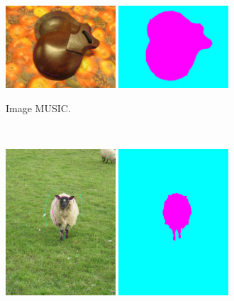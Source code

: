 \begin{figure}[htb]
	\centering	
	 \begin{subfigure}[B]{0.7\textwidth}	
			\includegraphics[width=0.45\textwidth]{images/evaluation/Milles/music_seeds.jpg}
			\includegraphics[width=0.45\textwidth]{images/evaluation/Milles/music_seg.png}
		 \caption{Image MUSIC.}
	\end{subfigure}	
	\\
	 \begin{subfigure}[B]{0.7\textwidth}	
			\includegraphics[width=0.45\textwidth]{images/evaluation/Milles/sheep_seeds.jpg}
			\includegraphics[width=0.45\textwidth]{images/evaluation/Milles/sheep_seg.png}

\end{subfigure}
\end{figure}
